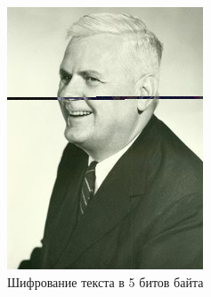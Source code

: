 \documentclass[10pt,a4paper,final]{article} %
\begin{document}
\begin{figure}[h!]
\begin{minipage}{0.3\textwidth}
		\includegraphics[width=\linewidth]{img/Haskell_5 (1)}
		\caption{Шифрование текста в 5 битов байта}
	\end{minipage}
\end{figure}

\newpage
\end{document}
